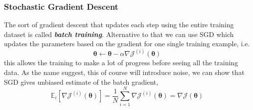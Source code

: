 \documentclass[11pt]{article}
\begin{document}
\subsubsection{Stochastic Gradient Descent}
The sort of gradient descent that updates each step using the entire training dataset is called \textit{\textbf{batch training}}. Alternative to that we can use SGD which updates the parameters based on the gradient for one single training example, i.e.
\begin{equation}
    \boldsymbol{\theta} \leftarrow \boldsymbol{\theta}-\alpha \nabla \mathcal{J}^{(i)}(\boldsymbol{\theta})
\end{equation}
this allows the training to make a lot of progress before seeing all the training data. As the name suggest, this of course will introduce noise, we can show that SGD gives unbiased estimate of the batch gradient, 
\begin{equation}
    \mathbb{E}_{i}\left[\nabla \mathcal{J}^{(i)}(\boldsymbol{\theta})\right]=\frac{1}{N} \sum_{i=1}^{N} \nabla \mathcal{J}^{(i)}(\boldsymbol{\theta})=\nabla \mathcal{J}(\boldsymbol{\theta})
\end{equation}
\end{document}
